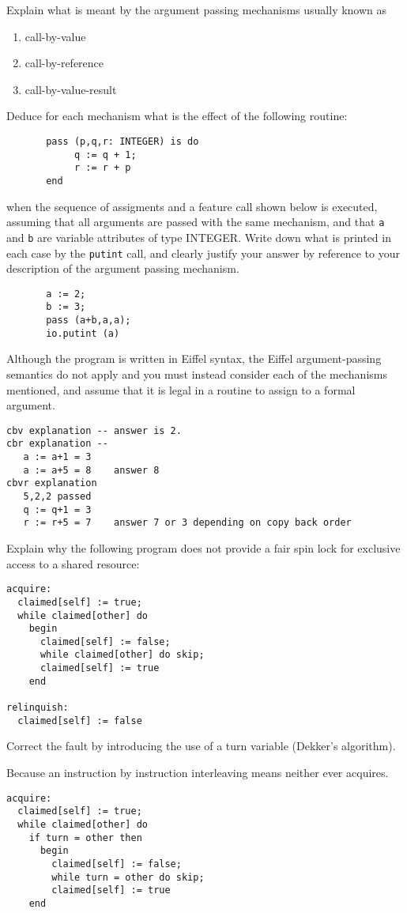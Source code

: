 \begin{questions}
\begin{subquestions}
\subquestion
Explain what is meant by the argument passing mechanisms usually
        known as
                \begin{enumerate}
                \item call-by-value
                \item call-by-reference
                \item call-by-value-result
                \end{enumerate}
        Deduce for each mechanism what is the effect of
        the following routine:
\begin{verbatim}
       pass (p,q,r: INTEGER) is do
            q := q + 1;
            r := r + p
       end
\end{verbatim}   
        when the sequence of assigments and a feature call
        shown below is executed, assuming that all arguments are
        passed with the same mechanism, and that \verb"a" and
        \verb"b" are variable attributes of type INTEGER.
        Write down what is printed in each case by the \verb"putint"
        call, and clearly justify your answer by reference to your
        description of the argument passing mechanism.
\begin{verbatim}
       a := 2;
       b := 3;
       pass (a+b,a,a);
       io.putint (a)
\end{verbatim}
Although the program is written in Eiffel syntax, the Eiffel
argument-passing semantics do not apply and you must
instead consider each of the mechanisms mentioned, and assume
that it is legal in a routine to assign to a formal argument.
\begin{modelanswer}
\begin{verbatim}
cbv explanation -- answer is 2.
cbr explanation -- 
   a := a+1 = 3
   a := a+5 = 8    answer 8
cbvr explanation
   5,2,2 passed
   q := q+1 = 3
   r := r+5 = 7    answer 7 or 3 depending on copy back order
\end{verbatim}
\end{modelanswer}

\subquestion
Explain why the following program does not provide a fair spin lock
for exclusive access to a shared resource:
\begin{verbatim}
acquire:
  claimed[self] := true;
  while claimed[other] do
    begin
      claimed[self] := false;
      while claimed[other] do skip;
      claimed[self] := true
    end

relinquish:
  claimed[self] := false
\end{verbatim}
Correct the fault by introducing the use of a turn variable
(Dekker's algorithm).
\begin{modelanswer}
Because an instruction by instruction interleaving means neither
ever acquires.
\begin{verbatim}
acquire:
  claimed[self] := true;
  while claimed[other] do
    if turn = other then
      begin
        claimed[self] := false;
        while turn = other do skip;
        claimed[self] := true
    end


\end{verbatim}
\end{modelanswer}
\end{subquestions}
\end{questions}

